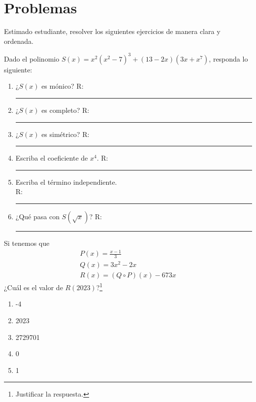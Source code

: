 \section*{\large Problemas}

Estimado estudiante, resolver los siguientes ejercicios de manera clara y ordenada.

\begin{exercise}
    Dado el polinomio $S(x) = x^2(x^2 - 7)^3 + (13 - 2x)(3x + x^7)$, responda lo siguiente:
    \begin{multicols}{2}
        \begin{enumerate}
            \item ¿$S(x)$ es mónico? R: \rule{1cm}{0.1mm}
            \item ¿$S(x)$ es completo? R: \rule{1cm}{0.1mm}
            \item ¿$S(x)$ es simétrico? R: \rule{1cm}{0.1mm}
            \item Escriba el coeficiente de $x^4$. R: \rule{1cm}{0.1mm}
            \item Escriba el término independiente.\\ R: \rule{1cm}{0.1mm}
            \item ¿Qué pasa con $S(\sqrt{x})$? R: \rule{2cm}{0.1mm}
        \end{enumerate}
    \end{multicols}
\end{exercise}

\begin{exercise}
    Si tenemos que
    \begin{align*}
        P(x) = \frac{x - 1}{3} \\
        Q(x) = 3x^2 - 2x \\
        R(x) = (Q \circ P)(x) - 673x
    \end{align*}
    ¿Cuál es el valor de $R(2023)$?\footnote{Justificar la respuesta.}
    \begin{multicols}{5}
        \begin{enumerate}
            \item -4
            \item 2023
            \item 2729701
            \item 0
            \item 1
        \end{enumerate}
    \end{multicols}
\end{exercise}

